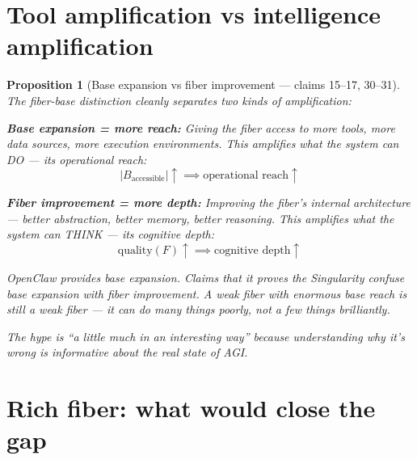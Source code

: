 \documentclass[11pt,a4paper]{article}
\newtheorem{proposition}[definition]{Proposition}
\begin{document}
\section{Tool amplification vs intelligence amplification}
\label{sec:amplification}

\begin{proposition}[Base expansion vs fiber improvement --- claims 15--17, 30--31]
\label{prop:amplification}
The fiber-base distinction cleanly separates two kinds of amplification:

\textbf{Base expansion = more reach:} Giving the fiber access to more
tools, more data sources, more execution environments. This amplifies
what the system can DO --- its operational reach:
\[
  |B_{\text{accessible}}| \uparrow \implies
  \text{operational reach} \uparrow
\]

\textbf{Fiber improvement = more depth:} Improving the fiber's internal
architecture --- better abstraction, better memory, better reasoning.
This amplifies what the system can THINK --- its cognitive depth:
\[
  \text{quality}(F) \uparrow \implies
  \text{cognitive depth} \uparrow
\]

OpenClaw provides base expansion. Claims that it proves the Singularity
confuse base expansion with fiber improvement. A weak fiber with
enormous base reach is still a weak fiber --- it can do many things
poorly, not a few things brilliantly.

The hype is ``a little much in an interesting way'' because understanding
\emph{why} it's wrong is informative about the real state of AGI.
\end{proposition}

\section{Rich fiber: what would close the gap}
\label{sec:rich}
\end{document}
